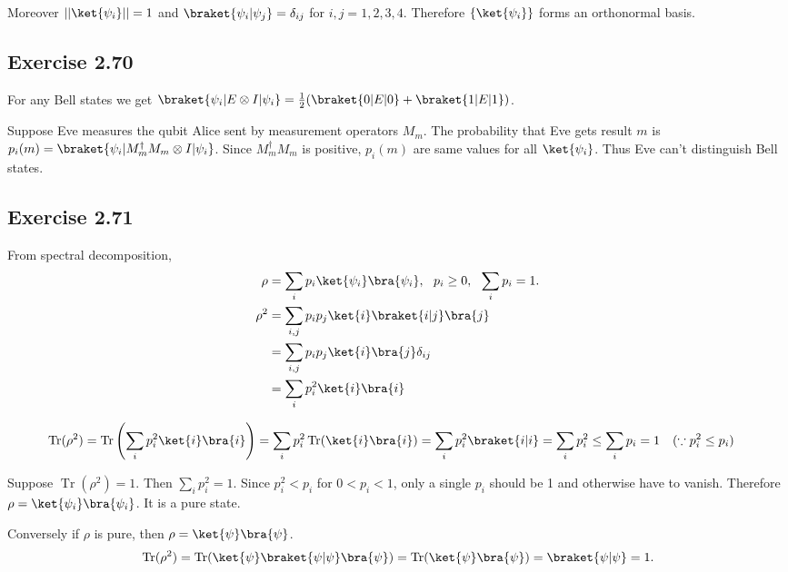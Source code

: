 \documentclass[a4paper,12pt]{article}
\DeclareMathOperator{\Tr}{Tr}
\begin{document}
Moreover $||\ket{\psi_i}|| = 1$ and $\braket{\psi_i | \psi_j} = \delta_{ij}$ for $i,j = 1, 2, 3, 4$.
Therefore $\{\ket{\psi_i}\}$ forms an orthonormal basis.




\subsection*{Exercise 2.70}

For any Bell states we get $\braket{\psi_i | E \otimes I | \psi_i} = \frac{1}{2} (\braket{0|E|0} + \braket{1|E|1})$.

Suppose Eve measures the qubit Alice sent by measurement operators $M_m$.
The probability that Eve gets result $m$ is $p_i(m) = \braket{\psi_i | M_m^\dagger M_m \otimes I | \psi_i}$.
Since $M ^\dagger_m M_m$ is positive, $p_i(m)$ are same values for all $\ket{\psi_i}$.
Thus Eve can't distinguish Bell states.




\subsection*{Exercise 2.71}
From spectral decomposition,
\begin{align*}
    \rho &= \sum_i p_i \ket{\psi_i}\bra{\psi_i}, ~~ p_i \geq 0, ~~ \sum_i p_i = 1.\\
    \rho^2 &= \sum_{i,j} p_i p_j \ket{i}\braket{i|j}\bra{j}\\
        &= \sum_{i,j} p_i p_j \ket{i}\bra{j}\delta_{ij}\\
        &= \sum_i p_i^2 \ket{i}\bra{i}
\end{align*}

\begin{align*}
    \Tr (\rho^2) &= \Tr \left(\sum_i p_i^2 \ket{i}\bra{i}\right)
        = \sum_i p_i^2 \Tr(\ket{i}\bra{i})
        = \sum_i p_i^2 \braket{i|i}
        = \sum_i p_i^2
        \leq \sum_i p_i = 1~~~ (\because p_i^2 \leq p_i)
\end{align*}

Suppose $\Tr (\rho^2) = 1$. Then $\sum_i p_i^2 = 1$.
Since $p_i^2 < p_i$ for $0 < p_i < 1$,
only a single $p_i$ should be 1 and otherwise have to  vanish.
Therefore $\rho = \ket{\psi_i}\bra{\psi_i}$. It is a pure state.

Conversely if $\rho$ is pure, then $\rho = \ket{\psi}\bra{\psi}$.
\begin{align*}
    \Tr (\rho^2) = \Tr (\ket{\psi}\braket{\psi | \psi} \bra{\psi}) = \Tr (\ket{\psi}\bra{\psi}) = \braket{\psi | \psi} = 1.
\end{align*}
\end{document}
